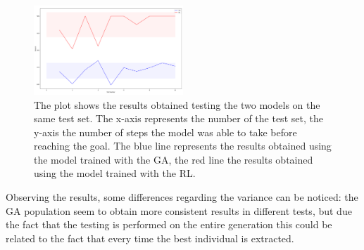 \begin{figure}[H]
	\centering
	\includegraphics [width=0.5\textwidth]{Images/GAvRL_backup.png}
	\caption{The plot shows the results obtained testing the two models on the same test set. The x-axis represents the number of the test set, the y-axis the number of steps the model was able to take before reaching the goal. The blue line represents the results obtained using the model trained with the GA, the red line the results obtained using the model trained with the RL.}
	\label{figRLvsGA}
\end{figure}

Observing the results, some differences regarding the variance can be noticed: the GA population seem to obtain more consistent results in different tests, but due the fact that the testing is performed on the entire generation this could be related to the fact that every time the best individual is extracted.\\


	





